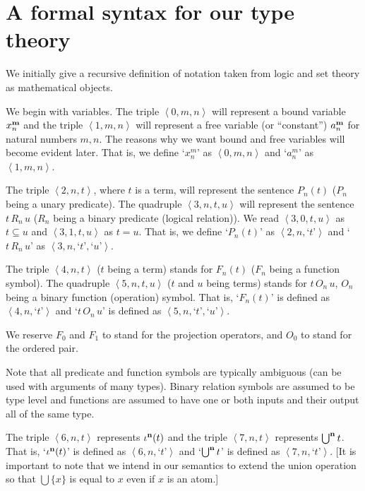 \documentclass[12pt]{book}
\begin{document}
\newpage

\section{A formal syntax for  our type theory}

We initially give a recursive definition of notation taken from logic
and set theory as mathematical objects.

We begin with variables.  The triple $\left<0,m,n\right>$ will
represent a bound variable $x^{\bf m}_n$ and the triple
$\left<1,m,n\right>$ will represent a free variable (or ``constant'')
$a^{\bf m}_n$ for natural numbers $m,n$.  The reasons why we want
bound and free variables will become evident later.  That is, we
define `$x^m_n$' as $\left<0,m,n\right>$ and `$a^m_n$' as
$\left<1,m,n\right>$.

The triple $\left<2,n,t\right>$, where $t$ is a term, will represent
the sentence $P_n(t)$ ($P_n$ being a unary predicate).  The quadruple
$\left<3,n,t,u\right>$ will represent the sentence $t \,R_n\,u$ ($R_n$
being a binary predicate (logical relation)).  We read
$\left<3,0,t,u\right>$ as $t\subseteq u$ and $\left<3,1,t,u\right>$ as $t=
u$.  That is, we define `$P_n(t)$' as $\left<2,n,\right.$`$t$'$\left.\right>$ and 
`$t \,R_n\,u$' as $\left<3,n,\right.$`$t$'$,$`$u$'$\left.\right>$.

The triple $\left<4,n,t\right>$ ($t$ being a term) stands for $F_n(t)$
($F_n$ being a function symbol).  The quadruple $\left<5,n,t,u\right>$
($t$ and $u$ being terms) stands for $t\,O_n\,u$, $O_n$ being a binary
function (operation) symbol.  That is, `$F_n(t)$' is defined as
$\left<4,n,\right.$`$t$'$\left.\right>$ and `$t\,O_n\,u$' is defined as
$\left<5,n,\right.$`$t$'$,$`$u$'$\left.\right>$.

We reserve $F_0$ and $F_1$ to stand for the projection operators,
and $O_0$ to stand for the ordered pair.

Note that all predicate and function symbols are typically ambiguous
(can be used with arguments of many types).  Binary relation symbols
are assumed to be type level and functions are assumed to have one or
both inputs and their output all of the same type.

The triple $\left<6,n,t\right>$ represents $\iota^{\bf n}(t)$ and the triple
$\left<7,n,t\right>$ represents $\bigcup^{\bf n} t$.    That is, `$\iota^{\bf n}(t)$'
is defined as $\left<6,n,\right.$`$t$'$\left.\right>$ and `$\bigcup^{\bf n} t$' is defined
as $\left<7,n,\right.$`$t$'$\left.\right>$. [It is important to note that we intend in our semantics to extend the union operation
so that $\bigcup \{x\}$ is equal to $x$ even if $x$ is an atom.]
\end{document}
